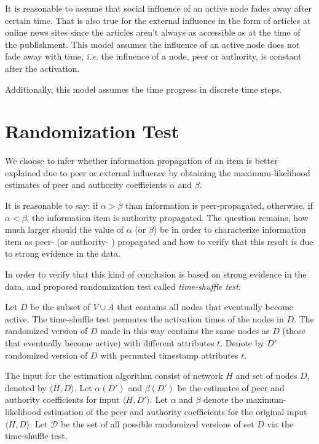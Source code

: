 \documentclass[times, utf8, zavrsni]{fer}
\begin{document}
It is reasonable to assume that social influence of an active  node fades away after certain time. That is also true for the external influence in the form of articles at online news sites since the articles aren't always as  accessible as at the time of the publishment. This model assumes the influence of an active node does not fade away with time, \emph{i.e.} the influence of a node, peer or authority, is constant after the activation.

Additionally, this model assumes the time progress in discrete time steps.


\section{Randomization Test}

We choose to infer whether information propagation of an item is better explained due to peer or external influence by obtaining the maximum-likelihood estimates of peer and authority coefficients $\alpha$ and $\beta$. 

It is reasonable to say: if $\alpha > \beta$ than information is peer-propagated, otherwise, if $\alpha <  \beta$, the information item is authority propagated. The question remains, how much larger should the value of $\alpha$ (or $\beta$) be in order to characterize information item as peer- (or authority- ) propagated and how to verify that this result is due to strong evidence in the data.

In order to verify that this kind of conclusion is based on strong evidence in the data, \cite{akm-icsn-kdd08} and \cite{authority} proposed randomization test called \emph{time-shuffle test}.

Let $D$ be the subset of $V \cup A$ that contains all nodes that eventually become active. The time-shuffle test permutes the activation times of the nodes in $D$. The randomized version of $D$ made in this way contains the same nodes as $D$ (those that eventually become active) with different attributes $t$. Denote by $D'$ randomized version of $D$ with permuted timestamp attributes $t$. 

The input for the estimation algorithm consist of network $H$ and set of nodes $D$, denoted by $\langle H, D\rangle$. Let $\alpha(D')$ and $\beta(D')$ be the estimates of peer and authority coefficients for input $\langle H, D'\rangle$. Let $\alpha$ and $\beta$ denote the maximum-likelihood estimation of the peer and authority coefficients for the original input $\langle H, D\rangle$. Let $\mathcal{D}$ be the set of all possible randomized versions of set $D$ via the time-shuffle test. 
\end{document}
